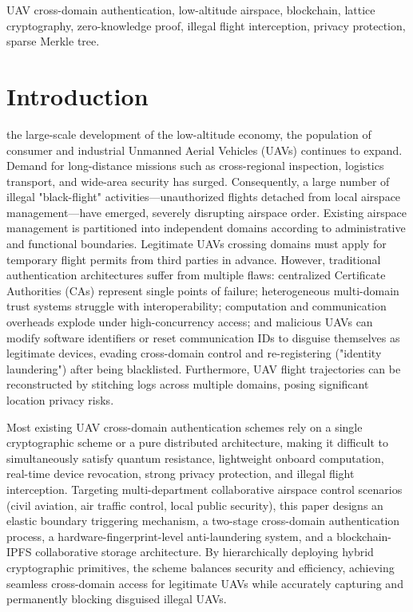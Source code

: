 \documentclass[lettersize,journal]{IEEEtran}
\begin{document}
\begin{IEEEkeywords}
UAV cross-domain authentication, low-altitude airspace, blockchain, lattice cryptography, zero-knowledge proof, illegal flight interception, privacy protection, sparse Merkle tree.
\end{IEEEkeywords}

\section{Introduction}
 the large-scale development of the low-altitude economy, the population of consumer and industrial Unmanned Aerial Vehicles (UAVs) continues to expand. Demand for long-distance missions such as cross-regional inspection, logistics transport, and wide-area security has surged. Consequently, a large number of illegal "black-flight" activities—unauthorized flights detached from local airspace management—have emerged, severely disrupting airspace order. Existing airspace management is partitioned into independent domains according to administrative and functional boundaries. Legitimate UAVs crossing domains must apply for temporary flight permits from third parties in advance. However, traditional authentication architectures suffer from multiple flaws: centralized Certificate Authorities (CAs) represent single points of failure; heterogeneous multi-domain trust systems struggle with interoperability; computation and communication overheads explode under high-concurrency access; and malicious UAVs can modify software identifiers or reset communication IDs to disguise themselves as legitimate devices, evading cross-domain control and re-registering ("identity laundering") after being blacklisted. Furthermore, UAV flight trajectories can be reconstructed by stitching logs across multiple domains, posing significant location privacy risks.

Most existing UAV cross-domain authentication schemes rely on a single cryptographic scheme or a pure distributed architecture, making it difficult to simultaneously satisfy quantum resistance, lightweight onboard computation, real-time device revocation, strong privacy protection, and illegal flight interception. Targeting multi-department collaborative airspace control scenarios (civil aviation, air traffic control, local public security), this paper designs an elastic boundary triggering mechanism, a two-stage cross-domain authentication process, a hardware-fingerprint-level anti-laundering system, and a blockchain-IPFS collaborative storage architecture. By hierarchically deploying hybrid cryptographic primitives, the scheme balances security and efficiency, achieving seamless cross-domain access for legitimate UAVs while accurately capturing and permanently blocking disguised illegal UAVs.
\end{document}
